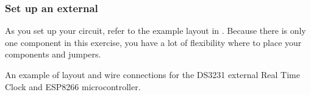 \subsubsection{\howto Set up an external \rtc}




As you set up your circuit, refer to the example layout in . 
Because there is only one component in this exercise, you have a lot of flexibility where to place your components and jumpers.
\begin{marginfigure}
	\begin{center}
		\caption[DS3231 on breadboard]{An example of layout and wire connections for the DS3231 external Real Time Clock and ESP8266 microcontroller.}
	\end{center}
\end{marginfigure}
